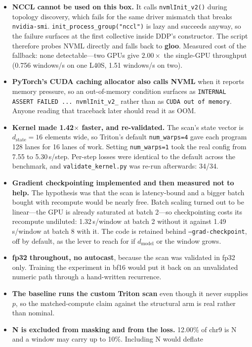 \documentclass[11pt,a4paper]{article}
\newcommand{\code}[1]{\texttt{\small #1}}
\newcommand{\warn}[1]{\textcolor{warncol}{\textbf{#1}}}
\begin{document}
\begin{itemize}
\item \warn{NCCL cannot be used on this box.} It calls \code{nvmlInit\_v2()}
during topology discovery, which fails for the same driver mismatch that breaks
\code{nvidia-smi}. \code{init\_process\_group("nccl")} is lazy and succeeds
anyway, so the failure surfaces at the first collective inside DDP's
constructor. The script therefore probes NVML directly and falls back to
\textbf{gloo}. Measured cost of the fallback: none detectable---two GPUs give
$2.00\times$ the single-GPU throughput (0.756 windows/s on one L40S,
1.51 windows/s on two).
\item \warn{PyTorch's CUDA caching allocator also calls NVML} when it reports
memory pressure, so an out-of-memory condition surfaces as
\code{INTERNAL ASSERT FAILED ... nvmlInit\_v2\_} rather than as
\code{CUDA out of memory}. Anyone reading that traceback later should read it
as OOM.
\item \textbf{Kernel made 1.42$\times$ faster, and re-validated.} The scan's
state vector is $d_{\text{state}}=16$ elements wide, so Triton's default
\code{num\_warps=4} gave each program 128 lanes for 16 lanes of work. Setting
\code{num\_warps=1} took the real config from 7.55 to 5.30\,s/step. Per-step
losses were identical to the default across the benchmark, and
\code{validate\_kernel.py} was re-run afterwards: 34/34.
\item \textbf{Gradient checkpointing implemented and then measured not to
help.} The hypothesis was that the scan is latency-bound and a bigger batch
bought with recompute would be nearly free. Batch scaling turned out to be
linear---the GPU is already saturated at batch 2---so checkpointing costs its
recompute undiluted: 1.32\,s/window at batch 2 without it against
1.49\,s/window at batch 8 with it. The code is retained behind
\code{--grad-checkpoint}, off by default, as the lever to reach for if
$d_{\text{model}}$ or the window grows.
\item \textbf{fp32 throughout, no autocast}, because the scan was validated in
fp32 only. Training the experiment in bf16 would put it back on an unvalidated
numeric path through a hand-written recurrence.
\item \textbf{The baseline runs the custom Triton scan} even though it never
supplies $p$, so the matched-compute claim against the structural arm is real
rather than nominal.
\item \textbf{N is excluded from masking and from the loss.} 12.00\% of chr9 is
N and a window may carry up to 10\%. Including N would deflate

\end{itemize}
\end{document}
